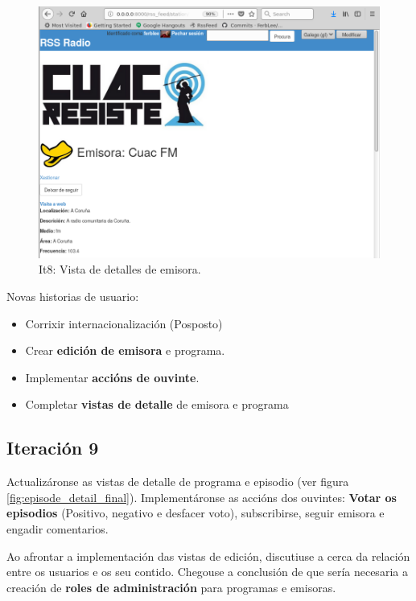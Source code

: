 \begin{figure}[H]
	\centering
	\includegraphics[scale=0.43,keepaspectratio=true]{./images/station_detail_final.png}
	\caption{It8: Vista de detalles de emisora.}
	\label{fig:station_detail_final}
\end{figure}

Novas historias de usuario:
\begin{itemize}
	\item Corrixir internacionalización (Posposto)
	\item Crear \textbf{edición de emisora} e programa.
	\item Implementar \textbf{accións de ouvinte}.
	\item Completar \textbf{vistas de detalle} de emisora e programa
\end{itemize}



\subsection{Iteración 9}

Actualizáronse as vistas de detalle de programa e episodio (ver figura \ref{fig:episode_detail_final}). Implementáronse as accións dos ouvintes: \textbf{Votar os episodios} (Positivo, negativo e desfacer voto), subscribirse, seguir emisora e engadir comentarios.

Ao afrontar a implementación das vistas de edición, discutiuse a cerca da relación entre os usuarios e os seu contido. Chegouse a conclusión de que sería necesaria a creación de \textbf{roles de administración} para programas e emisoras.

